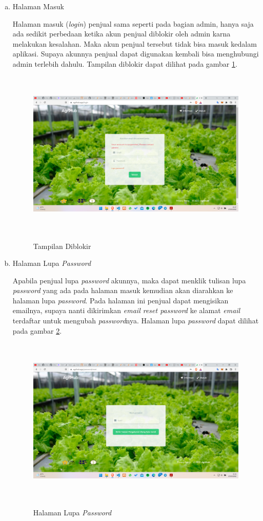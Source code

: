 \begin{enumerate}
\begin{enumerate}[a.]
		\item Halaman Masuk
		\par Halaman masuk (\textit{login}) penjual sama seperti pada bagian admin, hanya saja ada sedikit perbedaan ketika akun penjual diblokir oleh admin karna melakukan kesalahan. Maka akun penjual tersebut tidak bisa masuk kedalam aplikasi. Supaya akunnya penjual dapat digunakan kembali bisa menghubungi admin terlebih dahulu. Tampilan diblokir dapat dilihat pada gambar \ref*{diblokir}.
		\begin{figure}[H]
			\centering
			{\includegraphics [width = 13.3cm, height= 8cm]{gambar/diblokir}}
			\caption{Tampilan Diblokir}
			\label{diblokir}
		\end{figure}

		\item Halaman Lupa \textit{Password}
		\par Apabila penjual lupa \textit{password} akunnya, maka dapat menklik tulisan lupa \textit{password} yang ada pada halaman masuk kemudian akan diarahkan ke halaman lupa \textit{password}. Pada halaman ini penjual dapat mengisikan emailnya, supaya nanti dikirimkan \textit{email reset password} ke alamat \textit{email} terdaftar untuk mengubah \textit{password}nya. Halaman lupa \textit{password} dapat dilihat pada gambar \ref*{lupa_password}.
		\begin{figure}[H]
			\centering
			{\includegraphics [width = 13.3cm, height= 8cm]{gambar/lupa_password}}
			\caption{Halaman Lupa \textit{Password}}
			\label{lupa_password}
		\end{figure}


\end{enumerate}
\end{enumerate}
